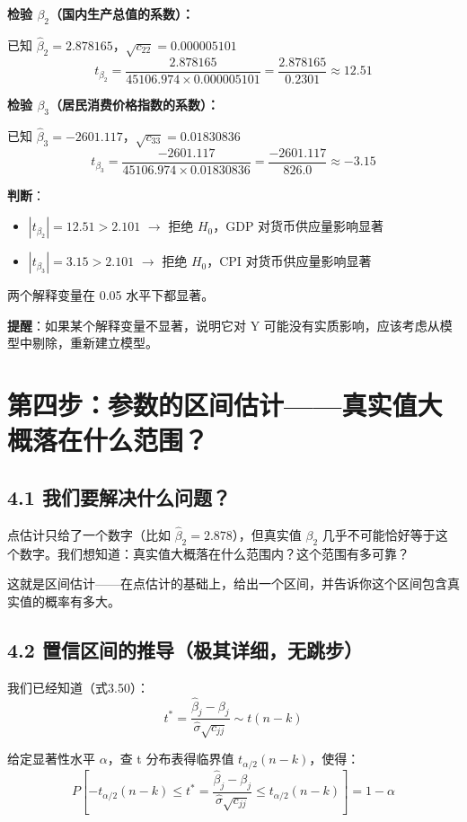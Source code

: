 \documentclass[12pt,a4paper]{ctexart}
\begin{document}
\textbf{检验 \(\beta_2\)（国内生产总值的系数）：}

已知 \(\hat{\beta}_2 = 2.878165\)，\(\sqrt{c_{22}} = 0.000005101\)
\[
t_{\beta_2} = \frac{2.878165}{45106.974 \times 0.000005101} = \frac{2.878165}{0.2301} \approx 12.51
\]

\textbf{检验 \(\beta_3\)（居民消费价格指数的系数）：}

已知 \(\hat{\beta}_3 = -2601.117\)，\(\sqrt{c_{33}} = 0.01830836\)
\[
t_{\beta_3} = \frac{-2601.117}{45106.974 \times 0.01830836} = \frac{-2601.117}{826.0} \approx -3.15
\]

\textbf{判断}：
\begin{itemize}
    \item \(|t_{\beta_2}| = 12.51 > 2.101\) \(\to\) 拒绝 \(H_0\)，GDP 对货币供应量影响显著
    \item \(|t_{\beta_3}| = 3.15 > 2.101\) \(\to\) 拒绝 \(H_0\)，CPI 对货币供应量影响显著
\end{itemize}
两个解释变量在 0.05 水平下都显著。

\textbf{提醒}：如果某个解释变量不显著，说明它对 Y 可能没有实质影响，应该考虑从模型中剔除，重新建立模型。

\section{第四步：参数的区间估计——真实值大概落在什么范围？}

\subsection{4.1 我们要解决什么问题？}

点估计只给了一个数字（比如 \(\hat{\beta}_2 = 2.878\)），但真实值 \(\beta_2\) 几乎不可能恰好等于这个数字。我们想知道：真实值大概落在什么范围内？这个范围有多可靠？

这就是区间估计——在点估计的基础上，给出一个区间，并告诉你这个区间包含真实值的概率有多大。

\subsection{4.2 置信区间的推导（极其详细，无跳步）}

我们已经知道（式3.50）：
\begin{equation}
t^* = \frac{\hat{\beta}_j - \beta_j}{\hat{\sigma}\sqrt{c_{jj}}} \sim t(n-k) \tag{3.53}
\end{equation}

给定显著性水平 \(\alpha\)，查 t 分布表得临界值 \(t_{\alpha/2}(n-k)\)，使得：
\[
P\left[-t_{\alpha/2}(n-k) \leq t^* = \frac{\hat{\beta}_j - \beta_j}{\hat{\sigma}\sqrt{c_{jj}}} \leq t_{\alpha/2}(n-k)\right] = 1 - \alpha
\]
\end{document}
